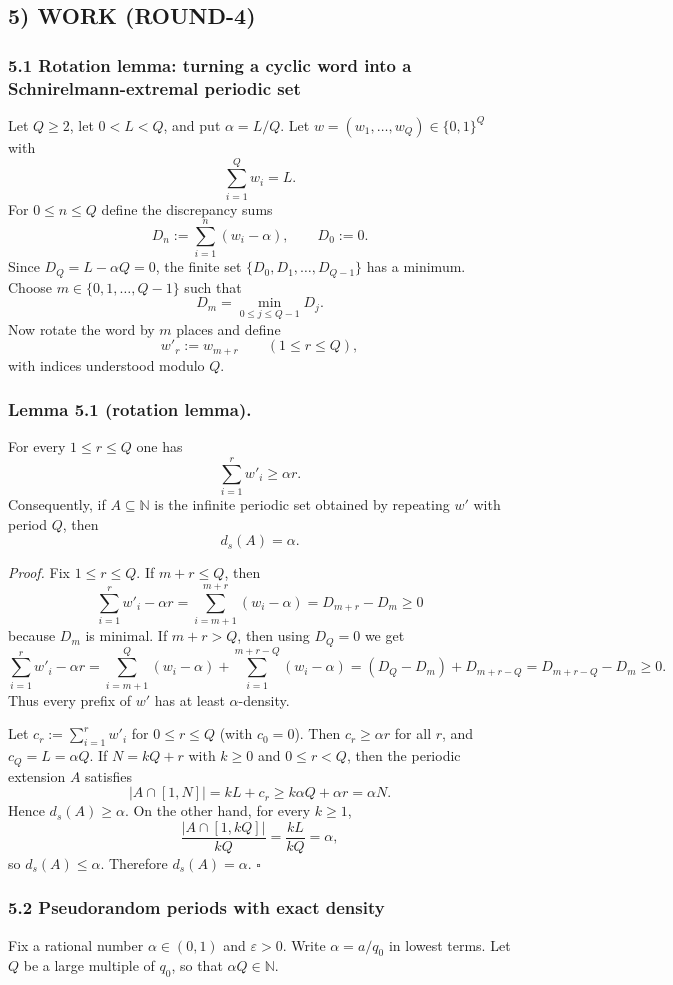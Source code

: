 \subsection*{5) WORK (ROUND-4)}

\subsubsection*{5.1 Rotation lemma: turning a cyclic word into a Schnirelmann-extremal periodic set}
Let $Q\ge 2$, let $0<L<Q$, and put $\alpha=L/Q$. Let $w=(w_1,\dots,w_Q)\in\{0,1\}^Q$ with
\[
\sum_{i=1}^Q w_i=L.
\]
For $0\le n\le Q$ define the discrepancy sums
\[
D_n:=\sum_{i=1}^n (w_i-\alpha),
\qquad D_0:=0.
\]
Since $D_Q=L-\alpha Q=0$, the finite set $\{D_0,D_1,\dots,D_{Q-1}\}$ has a minimum. Choose $m\in\{0,1,\dots,Q-1\}$ such that
\[
D_m=\min_{0\le j\le Q-1} D_j.
\]
Now rotate the word by $m$ places and define
\[
 w'_r := w_{m+r}
 \qquad (1\le r\le Q),
\]
with indices understood modulo $Q$.

\subsubsection*{Lemma 5.1 (rotation lemma).}
For every $1\le r\le Q$ one has
\[
\sum_{i=1}^r w'_i \ge \alpha r.
\]
Consequently, if $A\subseteq\mathbb N$ is the infinite periodic set obtained by repeating $w'$ with period $Q$, then
\[
 d_s(A)=\alpha.
\]

\emph{Proof.}
Fix $1\le r\le Q$.
If $m+r\le Q$, then
\[
\sum_{i=1}^r w'_i - \alpha r
 = \sum_{i=m+1}^{m+r}(w_i-\alpha)
 = D_{m+r}-D_m\ge 0
\]
because $D_m$ is minimal.
If $m+r>Q$, then using $D_Q=0$ we get
\[
\sum_{i=1}^r w'_i - \alpha r
= \sum_{i=m+1}^{Q}(w_i-\alpha)+\sum_{i=1}^{m+r-Q}(w_i-\alpha)
= (D_Q-D_m)+D_{m+r-Q}
= D_{m+r-Q}-D_m\ge 0.
\]
Thus every prefix of $w'$ has at least $\alpha$-density.

Let $c_r:=\sum_{i=1}^r w'_i$ for $0\le r\le Q$ (with $c_0=0$). Then $c_r\ge \alpha r$ for all $r$, and $c_Q=L=\alpha Q$. If $N=kQ+r$ with $k\ge 0$ and $0\le r<Q$, then the periodic extension $A$ satisfies
\[
|A\cap[1,N]| = kL+c_r \ge k\alpha Q + \alpha r = \alpha N.
\]
Hence $d_s(A)\ge \alpha$. On the other hand, for every $k\ge 1$,
\[
\frac{|A\cap[1,kQ]|}{kQ} = \frac{kL}{kQ}=\alpha,
\]
so $d_s(A)\le \alpha$. Therefore $d_s(A)=\alpha$. \hfill$\square$

\subsubsection*{5.2 Pseudorandom periods with exact density}
Fix a rational number $\alpha\in(0,1)$ and $\varepsilon>0$. Write $\alpha=a/q_0$ in lowest terms. Let $Q$ be a large multiple of $q_0$, so that $\alpha Q\in\mathbb N$.

